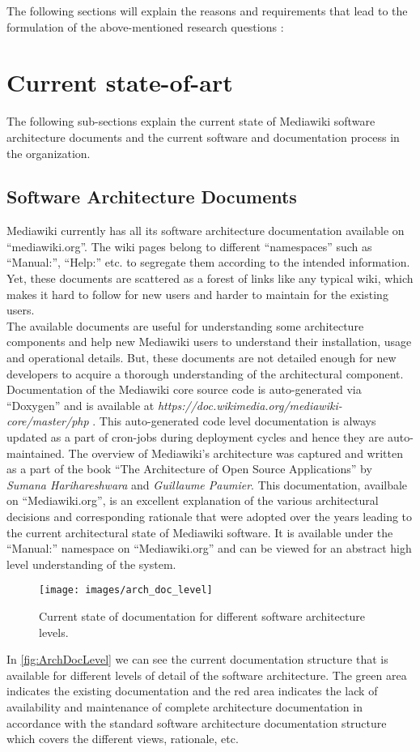 The following sections will explain the reasons and requirements that lead to the formulation of the above-mentioned research questions : 
 
\section{Current state-of-art}\label{CurrentSOA} 
\indent The following sub-sections explain the current state of Mediawiki software architecture documents and the current software and documentation process in the organization.
\subsection{Software Architecture Documents}
\indent Mediawiki currently has all its software architecture documentation available on \enquote{mediawiki.org}. The wiki pages belong to different \enquote{namespaces} such as \enquote{Manual:}, \enquote{Help:} etc. to segregate them according to the intended information. Yet, these documents are scattered as a forest of links like any typical wiki, which makes it hard to follow for new users and harder to maintain for the existing users. 
\\\indent The available documents are useful for understanding some architecture components and help new Mediawiki users to understand their installation, usage and operational details. But, these documents are not detailed enough for new developers to acquire a thorough understanding of the architectural component.  Documentation of the Mediawiki core source code is auto-generated via \enquote{Doxygen} and is available at \emph{https://doc.wikimedia.org/mediawiki-core/master/php }. This auto-generated code level documentation is always updated as a part of cron-jobs during deployment cycles and hence they are auto-maintained. The overview of Mediawiki's architecture was captured and written as a part of the book \enquote{The Architecture of Open Source Applications} by \emph{Sumana Harihareshwara} and \emph{Guillaume Paumier}. This documentation, availbale on \enquote{Mediawiki.org}, is an excellent explanation of the various architectural decisions and corresponding rationale that were adopted over the years leading to the current architectural state  of Mediawiki software. It is available under the \enquote{Manual:} namespace on \enquote{Mediawiki.org} and can be viewed for an abstract high level understanding of the system.
\begin{figure}[H]
  \centering
  \texttt{[image: images/arch\_doc\_level]}
  \caption[Documentation available for software architecture levels]{Current state of documentation for different software architecture levels.}\label{fig:ArchDocLevel}
\end{figure}
\indent In \autoref{fig:ArchDocLevel}  we can see the current documentation structure that is available for different levels of detail of the software architecture. The green area indicates the existing documentation and the red area indicates the lack of availability and maintenance of complete architecture documentation in accordance with the standard software architecture documentation structure \cite{BachmannDocumentingSoftware2010} which covers the different views, rationale,  etc.

